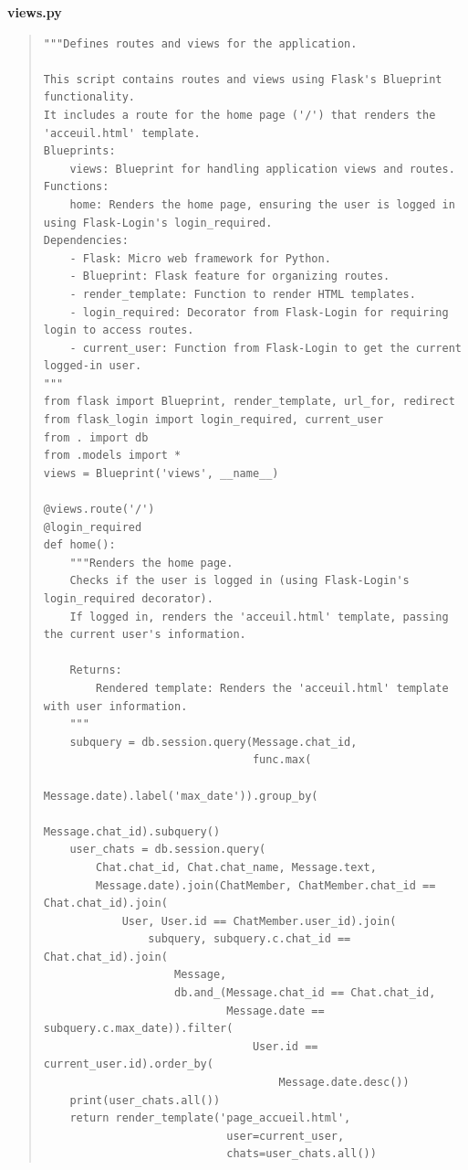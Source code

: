\documentclass{article}
\begin{document}
\newpage
\textbf{views.py}
\vspace*{1\baselineskip}
\begin{quote}
    
\begin{tcolorbox}[colback=grisClair,colframe=black]
    \begin{lstlisting}
"""Defines routes and views for the application.

This script contains routes and views using Flask's Blueprint functionality.
It includes a route for the home page ('/') that renders the 'acceuil.html' template.
Blueprints:
    views: Blueprint for handling application views and routes.
Functions:
    home: Renders the home page, ensuring the user is logged in using Flask-Login's login_required.
Dependencies:
    - Flask: Micro web framework for Python.
    - Blueprint: Flask feature for organizing routes.
    - render_template: Function to render HTML templates.
    - login_required: Decorator from Flask-Login for requiring login to access routes.
    - current_user: Function from Flask-Login to get the current logged-in user.
"""
from flask import Blueprint, render_template, url_for, redirect
from flask_login import login_required, current_user
from . import db
from .models import *
views = Blueprint('views', __name__)

@views.route('/')
@login_required
def home():
    """Renders the home page.
    Checks if the user is logged in (using Flask-Login's login_required decorator).
    If logged in, renders the 'acceuil.html' template, passing the current user's information.

    Returns:
        Rendered template: Renders the 'acceuil.html' template with user information.
    """  
    subquery = db.session.query(Message.chat_id,
                                func.max(
                                    Message.date).label('max_date')).group_by(
                                        Message.chat_id).subquery()
    user_chats = db.session.query(
        Chat.chat_id, Chat.chat_name, Message.text,
        Message.date).join(ChatMember, ChatMember.chat_id == Chat.chat_id).join(
            User, User.id == ChatMember.user_id).join(
                subquery, subquery.c.chat_id == Chat.chat_id).join(
                    Message,
                    db.and_(Message.chat_id == Chat.chat_id,
                            Message.date == subquery.c.max_date)).filter(
                                User.id == current_user.id).order_by(
                                    Message.date.desc())
    print(user_chats.all())
    return render_template('page_accueil.html',
                            user=current_user,
                            chats=user_chats.all())
    \end{lstlisting}       
\end{tcolorbox}


\end{quote}
\end{document}
